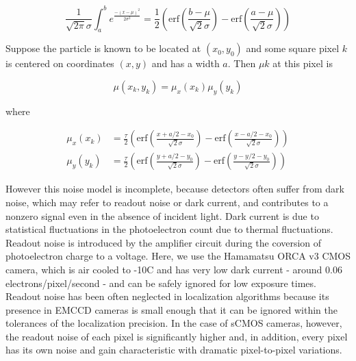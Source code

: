 \documentclass{ucetd}
\begin{document}
\begin{equation*}
\frac{1}{\sqrt{2\pi}\sigma}\int_{a}^{b} e^{\frac{-(x-\mu)^{2}}{2\sigma^{2}}} = \frac{1}{2}\left(\mathrm{erf}\left(\frac{b-\mu}{\sqrt{2}\sigma}\right) -\mathrm{erf}\left(\frac{a-\mu}{\sqrt{2}\sigma}\right)\right)
\end{equation*}

Suppose the particle is known to be located at $(x_{0},y_{0})$ and some square pixel $k$ is centered on coordinates $(x,y)$ and has a width $a$. Then $\mu{k}$ at this pixel is

\begin{equation}
\mu(x_{k},y_{k}) = \mu_{x}(x_{k})\mu_{y}(y_{k})
\end{equation}

where

\begin{align*}
\mu_{x}(x_{k}) &= \frac{\tau}{2}\left(\mathrm{erf}\left(\frac{x+a/2-x_{0}}{\sqrt{2}\sigma}\right) -\mathrm{erf}\left(\frac{x-a/2-x_{0}}{\sqrt{2}\sigma}\right)\right)\\
\mu_{y}(y_{k}) &= \frac{\tau}{2}\left(\mathrm{erf}\left(\frac{y+a/2-y_{0}}{\sqrt{2}\sigma}\right) -\mathrm{erf}\left(\frac{y-y/2-y_{0}}{\sqrt{2}\sigma}\right)\right)
\end{align*}


However this noise model is incomplete, because detectors often suffer from dark noise, which may refer to readout noise or dark current, and contributes to a nonzero signal even in the absence of incident light. Dark current is due to statistical fluctuations in the photoelectron count due to thermal fluctuations. Readout noise is introduced by the amplifier circuit during the coversion of photoelectron charge to a voltage. Here, we use the Hamamatsu ORCA v3 CMOS camera, which is air cooled to -10C and has very low dark current - around 0.06 electrons/pixel/second - and can be safely ignored for low exposure times. Readout noise has been often neglected in localization algorithms because its presence in EMCCD cameras is small enough that it can be ignored within the tolerances of the localization precision. In the case of sCMOS cameras, however, the readout noise of each pixel is significantly higher and, in addition, every pixel has its own noise and gain characteristic with dramatic pixel-to-pixel variations.
\end{document}
